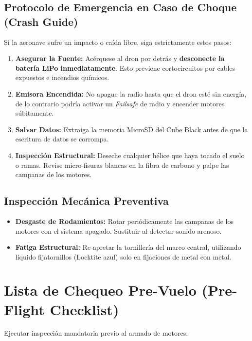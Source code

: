 \documentclass[12pt,a4paper]{article}
\begin{document}
\subsection{Protocolo de Emergencia en Caso de Choque (Crash Guide)}
Si la aeronave sufre un impacto o caída libre, siga estrictamente estos pasos:
\begin{enumerate}[leftmargin=*]
    \item \textbf{Asegurar la Fuente:} Acérquese al dron por detrás y \textbf{desconecte la batería LiPo inmediatamente}. Esto previene cortocircuitos por cables expuestos e incendios químicos.
    \item \textbf{Emisora Encendida:} No apague la radio hasta que el dron esté sin energía, de lo contrario podría activar un \textit{Failsafe} de radio y encender motores súbitamente.
    \item \textbf{Salvar Datos:} Extraiga la memoria MicroSD del Cube Black antes de que la escritura de datos se corrompa.
    \item \textbf{Inspección Estructural:} Deseche cualquier hélice que haya tocado el suelo o ramas. Revise micro-fisuras blancas en la fibra de carbono y palpe las campanas de los motores.
\end{enumerate}

\subsection{Inspección Mecánica Preventiva}
\begin{itemize}[leftmargin=*]
    \item \textbf{Desgaste de Rodamientos:} Rotar periódicamente las campanas de los motores con el sistema apagado. Sustituir al detectar sonido arenoso.
    \item \textbf{Fatiga Estructural:} Re-apretar la tornillería del marco central, utilizando líquido fijatornillos (Locktite azul) solo en fijaciones de metal con metal.
\end{itemize}

\newpage
\section*{Lista de Chequeo Pre-Vuelo (Pre-Flight Checklist)}
Ejecutar inspección mandatoria previo al armado de motores. \vspace{0.2cm}
\end{document}
